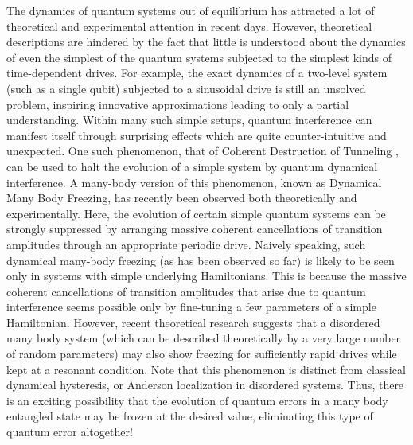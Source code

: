 \documentclass[a4paper,9pt]{article}
\begin{document}
The dynamics of quantum systems out of equilibrium has attracted a lot of theoretical and experimental attention in recent days. However, theoretical descriptions are hindered by the fact that little is understood about the dynamics of even the simplest of the quantum systems subjected to the simplest kinds of time-dependent drives. For example, the exact dynamics of a two-level system (such as a single qubit) subjected to a sinusoidal drive is still an unsolved problem, inspiring innovative approximations leading to only a partial understanding. Within many such simple setups, quantum interference can manifest itself through surprising effects which are quite counter-intuitive and unexpected. One such phenomenon, that of Coherent Destruction of Tunneling , can be used to halt the evolution of a simple system by quantum dynamical interference. A many-body version of this phenomenon, known as Dynamical Many Body Freezing, has recently been observed both theoretically and experimentally. Here, 
the evolution of certain simple quantum systems can be strongly suppressed by arranging massive coherent cancellations of transition amplitudes through an appropriate periodic drive.  Naively speaking, such dynamical many-body freezing (as has been observed so far) is likely to be seen only in systems with simple underlying Hamiltonians. This is because the massive coherent cancellations of transition amplitudes that arise due to quantum interference seems possible only by fine-tuning a few parameters of a simple Hamiltonian. However, recent theoretical research suggests that a disordered many body system (which can be described theoretically by a very large number of random parameters) may also show freezing for sufficiently rapid drives while kept at a resonant condition. Note that this phenomenon is distinct from classical dynamical hysteresis, or Anderson localization in disordered systems. Thus, there is an exciting possibility that the evolution of quantum errors in a many body entangled state may be frozen at the desired value, eliminating this type of quantum error altogether!
\end{document}
